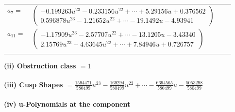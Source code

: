 \documentclass[1p]{elsarticle_modified}
\theoremstyle{definition}
\begin{document}
\begin{tabular}{m{7pt} m{180pt} m{7pt} m{180pt} }
\flushright $a_{7}=$&$\begin{pmatrix}-0.199263 u^{23}-0.233156 u^{22}+\cdots+5.29156 u+0.376562\\0.596878 u^{23}-1.21652 u^{22}+\cdots-19.1492 u-4.93941\end{pmatrix}$ \\
\flushright $a_{11}=$&$\begin{pmatrix}-1.17909 u^{23}-2.57707 u^{22}+\cdots-13.1205 u-3.43340\\2.15769 u^{23}+4.63645 u^{22}+\cdots+7.84946 u+0.726757\end{pmatrix}$\\&\end{tabular}
\flushleft \textbf{(ii) Obstruction class $= 1$}\\~\\
\flushleft \textbf{(iii) Cusp Shapes $= \frac{1594471}{580499} u^{23}-\frac{169294}{580499} u^{22}+\cdots-\frac{6694565}{580499} u-\frac{5053298}{580499}$}\\~\\
\newpage\renewcommand{\arraystretch}{1}
\flushleft \textbf{(iv) u-Polynomials at the component}\newline \\
\end{document}
